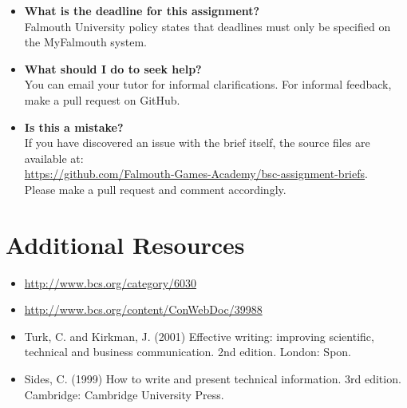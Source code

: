 \begin{itemize}
	\item 	\textbf{What is the deadline for this assignment?} \\ 
    		Falmouth University policy states that deadlines must only be specified on the MyFalmouth system.
    		
	\item 	\textbf{What should I do to seek help?} \\ 
    		You can email your tutor for informal clarifications. For informal feedback, make a pull request on GitHub. 
    		
    	\item 	\textbf{Is this a mistake?} \\ 	
    		If you have discovered an issue with the brief itself, the source files are available at: \\
    		\url{https://github.com/Falmouth-Games-Academy/bsc-assignment-briefs}.\\
    		 Please make a pull request and comment accordingly.
\end{itemize}

\section*{Additional Resources}

\begin{itemize}
   \item \url{http://www.bcs.org/category/6030}
   \item \url{http://www.bcs.org/content/ConWebDoc/39988}
   \item Turk, C. and Kirkman, J. (2001) Effective writing: improving scientific, technical and business communication. 2nd edition. London: Spon.
   \item Sides, C. (1999) How to write and present technical information. 3rd edition. Cambridge: Cambridge University Press.
   
   
\end{itemize}

